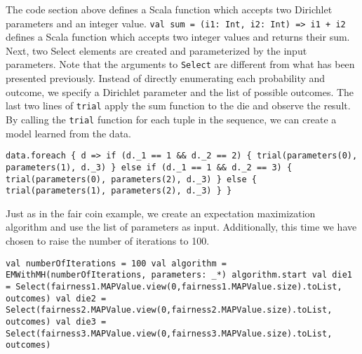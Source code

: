 The code section above defines a Scala function which accepts two Dirichlet parameters and an integer value. \texttt{val sum = (i1: Int, i2: Int) => i1 + i2} defines a Scala function which accepts two integer values and returns their sum.  Next, two Select elements are created and parameterized by the input parameters. Note that the arguments to \texttt{Select} are different from what has been presented previously. Instead of directly enumerating each probability and outcome, we specify a Dirichlet parameter and the list of possible outcomes. The last two lines of \texttt{trial} apply the sum function to the die and observe the result. By calling the \texttt{trial} function for each tuple in the sequence, we can create a model learned from the data.

\begin{flushleft}
\texttt{data.foreach \{ d =>
\newline if (d.\_1 == 1 \&\& d.\_2 == 2) \{
\newline \tab trial(parameters(0), parameters(1), d.\_3)
\newline \tab \} else if (d.\_1 == 1 \&\& d.\_2 == 3) \{
\newline \tab trial(parameters(0), parameters(2), d.\_3)
\newline \} else \{
\newline \tab trial(parameters(1), parameters(2), d.\_3)
\newline \}
\newline \}
}
\end{flushleft}

Just as in the fair coin example, we create an expectation maximization algorithm and use the list of parameters as input. Additionally, this time we have chosen to raise the number of iterations to 100.

\begin{flushleft}
\texttt{val numberOfIterations = 100
\newline val algorithm = EMWithMH(numberOfIterations, parameters: \_*)
\newline algorithm.start
\newline 
\newline val die1 = Select(fairness1.MAPValue.view(0,fairness1.MAPValue.size).toList, outcomes)  
\newline val die2 = Select(fairness2.MAPValue.view(0,fairness2.MAPValue.size).toList, outcomes) 
\newline val die3 = Select(fairness3.MAPValue.view(0,fairness3.MAPValue.size).toList, outcomes) 
}
\end{flushleft}

